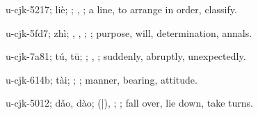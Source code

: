 \begin{multicols}{2}
{\cjkgGlue{}u-cjk-5217; liè; \cjkgGlue{}; \cjkgGlue{}, \cjkgGlue{}; a line, to arrange in order, classify.

\cjkgGlue{}u-cjk-5fd7; zhì; \cjkgGlue{}, \cjkgGlue{}\cjkgGlue{}\cjkgGlue{}, \cjkgGlue{}; \cjkgGlue{}; purpose, will, determination, annals.

\cjkgGlue{}u-cjk-7a81; tú, tū; \cjkgGlue{}\cjkgGlue{}\cjkgGlue{}; \cjkgGlue{}, \cjkgGlue{}; suddenly, abruptly, unexpectedly.

\cjkgGlue{}u-cjk-614b; tài; \cjkgGlue{}\cjkgGlue{}\cjkgGlue{}; \cjkgGlue{}; manner, bearing, attitude.

\cjkgGlue{}u-cjk-5012; dǎo, dào; \cjkgGlue{}\cjkgGlue{}(\cjkgGlue{}|\cjkgGlue{}), \cjkgGlue{}\cjkgGlue{}\cjkgGlue{}; \cjkgGlue{}; fall over, lie down, take turns.

}
\end{multicols}
